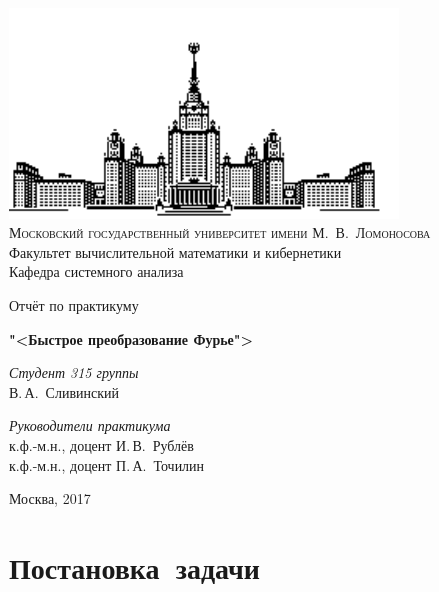 \documentclass[11pt, oneside, draft]{article}
\numberwithin{equation}{section}
\begin{document}
    \thispagestyle{empty}
    \begin{center}
        \ \vspace{-3cm}
    
        \includegraphics[width=0.5
        \textwidth]{msu}\\
        {\scshape Московский государственный университет имени М.~В.~Ломоносова}\\
        Факультет вычислительной математики и кибернетики\\
        Кафедра системного анализа
    
        \vfill
    
        {\LARGE Отчёт по практикуму}
    
        \vspace{1cm}
    
        {\Huge\bfseries "<Быстрое преобразование Фурье">} 
    \end{center}

    \vspace{1cm}
    \begin{flushright}
        \large \textit{Студент 315 группы}\\
        В.\,А.~Сливинский
    
        \vspace{5mm}
    
        \textit{Руководители практикума}\\
        к.ф.-м.н., доцент И.\,В.~Рублёв \\
        к.ф.-м.н., доцент П.\,А.~Точилин 
    \end{flushright}

    \vfill
    \begin{center}
        Москва, 2017 
    \end{center}
    \pagebreak

    \tableofcontents

    \pagebreak



    \section{Постановка~задачи}
\end{document}
